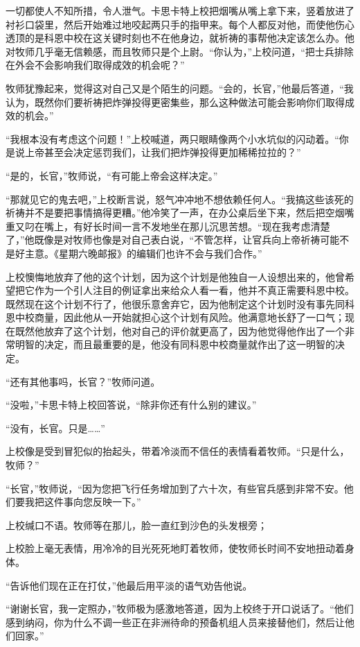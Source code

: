     一切都使人不知所措，令人泄气。卡思卡特上校把烟嘴从嘴上拿下来，竖着放进了衬衫口袋里，然后开始难过地咬起两只手的指甲来。每个人都反对他，而使他伤心透顶的是科恩中校在这关键时刻也不在他身边，就祈祷的事帮他决定该怎么办。他对牧师几乎毫无信赖感，而且牧师只是个上尉。“你认为，”上校问道，“把士兵排除在外会不会影响我们取得成效的机会呢？”

    牧师犹豫起来，觉得这对自己又是个陌生的问题。“会的，长官，”他最后答道，“我认为，既然你们要祈祷把炸弹投得更密集些，那么这种做法可能会影响你们取得成效的机会。”

    “我根本没有考虑这个问题！”上校喊道，两只眼睛像两个小水坑似的闪动着。“你是说上帝甚至会决定惩罚我们，让我们把炸弹投得更加稀稀拉拉的？”

    “是的，长官，”牧师说，“有可能上帝会这样决定。”

    “那就见它的鬼去吧，”上校断言说，怒气冲冲地不想依赖任何人。“我搞这些该死的祈祷并不是要把事情搞得更糟。”他冷笑了一声，在办公桌后坐下来，然后把空烟嘴重又叼在嘴上，有好长时间一言不发地坐在那儿沉思苦想。“现在我考虑清楚了，”他既像是对牧师也像是对自己表白说，“不管怎样，让官兵向上帝祈祷可能不是好主意。《星期六晚邮报》的编辑们也许不会与我们合作。”

    上校懊悔地放弃了他的这个计划，因为这个计划是他独自一人设想出来的，他曾希望把它作为一个引人注目的例证拿出来给众人看一看，他并不真正需要科恩中校。既然现在这个计划不行了，他很乐意舍弃它，因为他制定这个计划时没有事先同科恩中校商量，因此他从一开始就担心这个计划有风险。他满意地长舒了一口气；现在既然他放弃了这个计划，他对自己的评价就更高了，因为他觉得他作出了一个非常明智的决定，而且最重要的是，他没有同科恩中校商量就作出了这一明智的决定。

    “还有其他事吗，长官？”牧师问道。

    “没啦，”卡思卡特上校回答说，“除非你还有什么别的建议。”

    “没有，长官。只是……”

    上校像是受到冒犯似的抬起头，带着冷淡而不信任的表情看着牧师。“只是什么，牧师？”

    “长官，”牧师说，“因为您把飞行任务增加到了六十次，有些官兵感到非常不安。他们要我把这件事向您反映一下。”

    上校缄口不语。牧师等在那儿，脸一直红到沙色的头发根旁；

    上校脸上毫无表情，用冷冷的目光死死地盯着牧师，使牧师长时间不安地扭动着身体。

    “告诉他们现在正在打仗，”他最后用平淡的语气劝告他说。

    “谢谢长官，我一定照办，”牧师极为感激地答道，因为上校终于开口说话了。“他们感到纳闷，你为什么不调一些正在非洲待命的预备机组人员来接替他们，然后让他们回家。”

